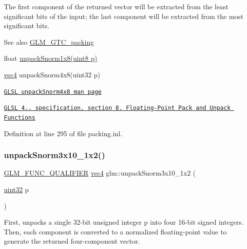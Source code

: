The first component of the returned vector will be extracted from the least significant bits of the input; the last component will be extracted from the most significant bits.

\begin{DoxySeeAlso}{See also}
\hyperlink{group__gtc__packing}{G\+L\+M\+\_\+\+G\+T\+C\+\_\+packing} 

float \hyperlink{group__gtc__packing_ga6f2bebf536fbf7c8b97d4b306bb3354e}{unpack\+Snorm1x8(uint8 p)} 

\hyperlink{group__core__types_ga5881b1b022d7fd1b7218f5916532dd02}{vec4} unpack\+Snorm4x8(uint32 p) 

\href{http://www.opengl.org/sdk/docs/manglsl/xhtml/unpackSnorm4x8.xml}{\tt G\+L\+SL unpack\+Snorm4x8 man page} 

\href{http://www.opengl.org/registry/doc/GLSLangSpec.4.20.8.pdf}{\tt G\+L\+SL 4.. specification, section 8. Floating-\/\+Point Pack and Unpack Functions} 
\end{DoxySeeAlso}


Definition at line 295 of file packing.\+inl.

\mbox{\label{group__gtc__packing_ga8b8bb827a3743ca553d8702d3e337101}} 
\subsubsection{\texorpdfstring{unpack\+Snorm3x10\+\_\+1x2()}{unpackSnorm3x10\_1x2()}}
{\footnotesize\ttfamily \hyperlink{setup_8hpp_a33fdea6f91c5f834105f7415e2a64407}{G\+L\+M\+\_\+\+F\+U\+N\+C\+\_\+\+Q\+U\+A\+L\+I\+F\+I\+ER} \hyperlink{group__core__types_ga5881b1b022d7fd1b7218f5916532dd02}{vec4} glm\+::unpack\+Snorm3x10\+\_\+1x2 (\begin{DoxyParamCaption}\item[{\hyperlink{group__gtc__type__precision_ga202b6a53c105fcb7e531f9b443518451}{uint32}}]{p }\end{DoxyParamCaption})}

First, unpacks a single 32-\/bit unsigned integer p into four 16-\/bit signed integers. Then, each component is converted to a normalized floating-\/point value to generate the returned four-\/component vector.

